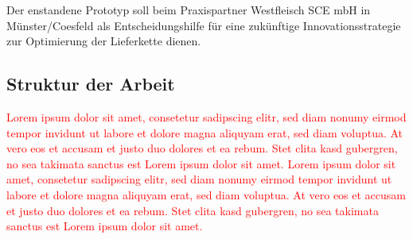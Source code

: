 Der enstandene Prototyp soll beim Praxispartner Westfleisch SCE mbH in Münster/Coesfeld als Entscheidungshilfe für eine zukünftige Innovationsstrategie zur Optimierung der Lieferkette dienen.

\subsection{Struktur der Arbeit}

\textcolor{red}{Lorem ipsum dolor sit amet, consetetur sadipscing elitr, sed diam nonumy eirmod tempor invidunt ut labore et dolore magna aliquyam erat, sed diam voluptua. At vero eos et accusam et justo duo dolores et ea rebum. Stet clita kasd gubergren, no sea takimata sanctus est Lorem ipsum dolor sit amet. Lorem ipsum dolor sit amet, consetetur sadipscing elitr, sed diam nonumy eirmod tempor invidunt ut labore et dolore magna aliquyam erat, sed diam voluptua. At vero eos et accusam et justo duo dolores et ea rebum. Stet clita kasd gubergren, no sea takimata sanctus est Lorem ipsum dolor sit amet.}

\newpage
